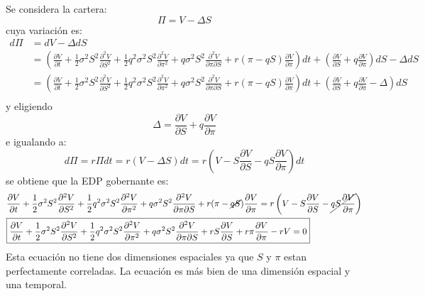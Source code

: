 Se considera la cartera:
\begin{equation*}
    \Pi = V - \Delta S
\end{equation*}
cuya variación es:
\begin{align*}
    d\Pi &= dV - \Delta dS \\
    &= \left( \frac{\partial V}{\partial t} + \frac{1}{2}\sigma^2 S^2 \frac{\partial^2 V}{\partial S^2} + \frac{1}{2}q^2\sigma^2 S^2 \frac{\partial^2 V}{\partial \pi^2} + q\sigma^2 S^2 \frac{\partial^2 V}{\partial \pi \partial S} + r(\pi - q S)\frac{\partial V}{\partial \pi} \right)dt + \left( \frac{\partial V}{\partial S} + q\frac{\partial V}{\partial \pi} \right)dS - \Delta dS \\
    &= \left( \frac{\partial V}{\partial t} + \frac{1}{2}\sigma^2 S^2 \frac{\partial^2 V}{\partial S^2} + \frac{1}{2}q^2\sigma^2 S^2 \frac{\partial^2 V}{\partial \pi^2} + q\sigma^2 S^2 \frac{\partial^2 V}{\partial \pi \partial S} + r(\pi - q S)\frac{\partial V}{\partial \pi} \right)dt + \left( \frac{\partial V}{\partial S} + q\frac{\partial V}{\partial \pi} - \Delta \right)dS \\
\end{align*}
y eligiendo
\begin{equation*}
    \Delta = \frac{\partial V}{\partial S} + q\frac{\partial V}{\partial \pi}
\end{equation*}
e igualando a:
\begin{equation*}
    d\Pi = r\Pi dt = r(V - \Delta S)dt = r\left(V - S\frac{\partial V}{\partial S} - qS\frac{\partial V}{\partial \pi}\right)dt
\end{equation*}
se obtiene que la EDP gobernante es:
\begin{align}\label{eq:passport}
    &\frac{\partial V}{\partial t} + \frac{1}{2}\sigma^2 S^2 \frac{\partial^2 V}{\partial S^2} + \frac{1}{2}q^2\sigma^2 S^2 \frac{\partial^2 V}{\partial \pi^2} + q\sigma^2 S^2 \frac{\partial^2 V}{\partial \pi \partial S} + r(\pi - \cancel{q S})\frac{\partial V}{\partial \pi} = r\left(V - S\frac{\partial V}{\partial S} - \cancel{qS\frac{\partial V}{\partial \pi}}\right) \nonumber \\
    &\boxed{\frac{\partial V}{\partial t} + \frac{1}{2}\sigma^2 S^2 \frac{\partial^2 V}{\partial S^2} + \frac{1}{2}q^2\sigma^2 S^2 \frac{\partial^2 V}{\partial \pi^2} + q\sigma^2 S^2 \frac{\partial^2 V}{\partial \pi \partial S} + rS\frac{\partial V}{\partial S} + r\pi\frac{\partial V}{\partial \pi} - rV = 0}
\end{align}
Esta ecuación no tiene dos dimensiones espaciales ya que $S$ y $\pi$ estan perfectamente correladas. La ecuación es más bien de una dimensión espacial y una temporal. 

